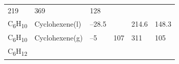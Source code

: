 \documentclass[
]{book}
\theoremstyle{definition}
\theoremstyle{definition}
\theoremstyle{definition}
\theoremstyle{remark}
\begin{document}
\begin{longtable}[]{@{}llllll@{}}
\begin{minipage}[t]{0.15\columnwidth}
219\strut
\end{minipage} & \begin{minipage}[t]{0.14\columnwidth}\raggedright
369\strut
\end{minipage} & \begin{minipage}[t]{0.14\columnwidth}\raggedright
128\strut
\end{minipage}\tabularnewline
\begin{minipage}[t]{0.07\columnwidth}\raggedright
C\textsubscript{6}H\textsubscript{10}\strut
\end{minipage} & \begin{minipage}[t]{0.17\columnwidth}\raggedright
Cyclohexene(l)\strut
\end{minipage} & \begin{minipage}[t]{0.15\columnwidth}\raggedright
--28.5\strut
\end{minipage} & \begin{minipage}[t]{0.15\columnwidth}\raggedright
\strut
\end{minipage} & \begin{minipage}[t]{0.14\columnwidth}\raggedright
214.6\strut
\end{minipage} & \begin{minipage}[t]{0.14\columnwidth}\raggedright
148.3\strut
\end{minipage}\tabularnewline
\begin{minipage}[t]{0.07\columnwidth}\raggedright
C\textsubscript{6}H\textsubscript{10}\strut
\end{minipage} & \begin{minipage}[t]{0.17\columnwidth}\raggedright
Cyclohexene(g)\strut
\end{minipage} & \begin{minipage}[t]{0.15\columnwidth}\raggedright
--5\strut
\end{minipage} & \begin{minipage}[t]{0.15\columnwidth}\raggedright
107\strut
\end{minipage} & \begin{minipage}[t]{0.14\columnwidth}\raggedright
311\strut
\end{minipage} & \begin{minipage}[t]{0.14\columnwidth}\raggedright
105\strut
\end{minipage}\tabularnewline
\begin{minipage}[t]{0.07\columnwidth}\raggedright
C\textsubscript{6}H\textsubscript{12}\strut
\end{minipage} & \begin{minipage}[t]{0.17\columnwidth}\raggedright

\end{minipage}
\end{longtable}
\end{document}

